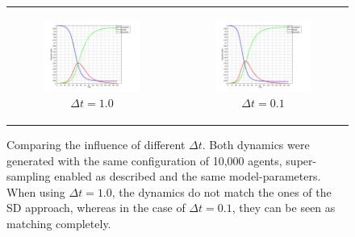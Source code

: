 \begin{figure}
\begin{center}
	\begin{tabular}{c c}
		\begin{subfigure}[b]{0.5\textwidth}
			\centering
			\includegraphics[width=.8\textwidth, angle=0]{./../shared/fig/frabs/SIR_10000agents_150t_1dt_parallel.png}
			\caption{$\Delta t = 1.0$}
			\label{fig:sir_10000_1dt}
		\end{subfigure}
	
		&
		
		\begin{subfigure}[b]{0.5\textwidth}
			\centering
			\includegraphics[width=.8\textwidth, angle=0]{./../shared/fig/frabs/SIR_10000agents_150t_01dt_parallel.png}
			\caption{$\Delta t = 0.1$}
			\label{fig:sir_10000_01dt}
		\end{subfigure}
	\end{tabular}
	
	\caption{Comparing the influence of different $\Delta t$. Both dynamics were generated with the same configuration of 10,000 agents, super-sampling enabled as described and the same model-parameters. When using $\Delta t = 1.0$, the dynamics do not match the ones of the SD approach, whereas in the case of $\Delta t = 0.1$, they can be seen as matching completely.} 
	\label{fig:sir_10000_dt_comparisons}
\end{center}
\end{figure}

